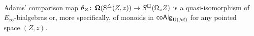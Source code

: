 \begin{lemma}
	Adams' comparison map $\theta_Z \colon \operatorname{\mathbf{\Omega}}(\operatorname{S^{\triangle}}(Z, z)) \to S^{\square}(\Omega_z Z)$ is a quasi-isomorphism of $E_{\infty}$-bialgebras or, more specifically, of monoids in $\mathsf{coAlg}_{\operatorname{U}(\mathcal{M})}$ for any pointed space $(Z, z)$.
\end{lemma}


